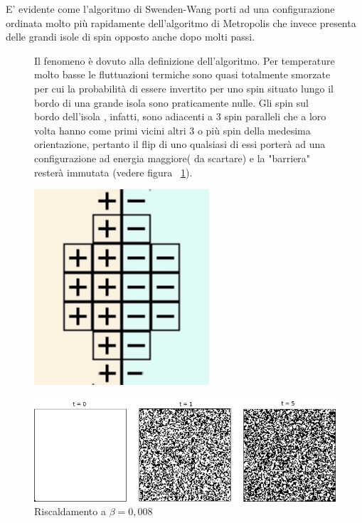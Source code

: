 E' evidente come l'algoritmo di Swenden-Wang porti ad una configurazione ordinata molto più rapidamente dell'algoritmo di Metropolis che invece presenta delle grandi isole di spin opposto anche dopo molti passi.
\begin{figure}[htbp]
     \begin{minipage}{0.8\textwidth}
Il fenomeno è dovuto alla definizione dell'algoritmo. Per temperature molto basse le fluttuazioni termiche sono quasi totalmente smorzate per cui la probabilità di essere invertito per uno spin situato lungo il bordo di una grande isola sono praticamente nulle. 
Gli spin sul bordo dell'isola , infatti, sono adiacenti a 3 spin paralleli che a loro volta hanno come primi vicini altri 3 o più spin della medesima orientazione, pertanto il flip di uno qualsiasi di essi porterà ad una configurazione ad energia maggiore( da scartare) e la "barriera" resterà immutata (vedere figura ~\ref{fig:bariera spin}).
     \end{minipage}\hfill
     \begin{minipage}{0.2\textwidth}
      \centering
\includegraphics[width=0.58\textwidth]{Immagini/bariera.jpg}
       \caption[Bariera di Spin.]{}\label{fig:bariera spin}
     \end{minipage}
   \end{figure}
\bigskip
     \begin {figure}[h!]
      \begin{center}
		\caption{Riscaldamento a $\beta = 0,008 $ }\label{fig:riscaldamento}
        \includegraphics[scale=0.5]{Immagini/Metro_riscaldamento.jpg}
      \end{center}
\end {figure}

